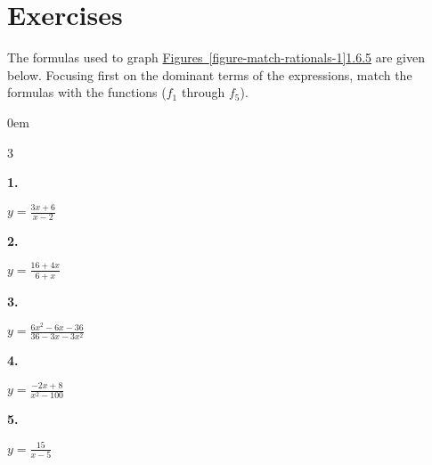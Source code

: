 \documentclass[12pt,]{book}
\theoremstyle{plain}
\theoremstyle{definition}
\numberwithin{equation}{section}
\newcounter{figstack}
\newlength\fight
\newcommand\pushValignCaptionBottom[5][b]{%
\stepcounter{figstack}%
\expandafter\def\csname %
figalign\romannumeral\value{figstack}\endcsname{#1}%
\expandafter\def\csname %
figtype\romannumeral\value{figstack}\endcsname{#2}%
\expandafter\def\csname %
figwd\romannumeral\value{figstack}\endcsname{#3}%
\expandafter\def\csname %
figcontent\romannumeral\value{figstack}\endcsname{#4}%
\expandafter\def\csname %
figcap\romannumeral\value{figstack}\endcsname{#5}%
\setbox0=\hbox{%
\begin{#2}{#3}#4\end{#2}}%
\ifdim\dimexpr\ht0+\dp0\relax>\fight\global\setlength{\fight}{%
\dimexpr\ht0+\dp0\relax}\fi%
}
\newenvironment{exercisegroup}%
{\medskip\noindent}%
{\par\bigskip}%
\newlength{\exercisegroupindent}%
\newlength{\exercisegroupitemwidth}%
\newenvironment{exercisegrouplist}%
{\vspace{-\partopsep}%
\begin{adjustwidth}{\exercisegroupindent}{0em}}%
{\end{adjustwidth}%
\vspace{-\partopsep}%
\vspace{\baselineskip}}%
\newenvironment{exercisegroupbycol}[1]%
{\begin{exercisegrouplist}%
\vspace{-\multicolsep}%
\begin{multicols}{#1}%
\setlength{\parindent}{0em}%
\setlength{\exercisegroupitemwidth}{\linewidth}}%
{\end{multicols}%
\vspace{-\multicolsep}%
\end{exercisegrouplist}}%
\newenvironment{exercisegroupitem}[1]%
{\begin{minipage}[t]{\exercisegroupitemwidth}
\vspace{0pt}%
{\bfseries#1}%
\rule{0pt}{\baselineskip}}{\strut%
\end{minipage}%
\hspace{\columnsep}}%
\providecommand\phantomsection{}
\begin{document}
\section*{Exercises}\label{exercises-6}

\begin{exercisegroup}%
The formulas used to graph \hyperref[figure-match-rationals-1]{Figures~\ref*{figure-match-rationals-1}}\textendash{}\hyperref[figure-match-rationals-5]{1.6.5} are given below.  Focusing first on the dominant terms of the expressions, match the formulas with the functions (\(f_1\) through \(f_5\)).%
\par
\begin{exercisegroupbycol}{3}%
\begin{exercisegroupitem}{1. }\phantomsection\hypertarget{exercise-47}{\null}
\(y=\frac{3x+6}{x-2}\)%
\end{exercisegroupitem}%
\par%
\begin{exercisegroupitem}{2. }\phantomsection\hypertarget{exercise-48}{\null}
\(y=\frac{16+4x}{6+x}\)%
\end{exercisegroupitem}%
\par%
\begin{exercisegroupitem}{3. }\phantomsection\hypertarget{exercise-49}{\null}
\(y=\frac{6x^2-6x-36}{36-3x-3x^2}\)%
\end{exercisegroupitem}%
\par%
\begin{exercisegroupitem}{4. }\phantomsection\hypertarget{exercise-50}{\null}
\(y=\frac{-2x+8}{x^2-100}\)%
\end{exercisegroupitem}%
\par%
\begin{exercisegroupitem}{5. }\phantomsection\hypertarget{exercise-51}{\null}
\(y=\frac{15}{x-5}\)%
\end{exercisegroupitem}%
\par%
\end{exercisegroupbycol}%
\begin{figure}
\centering
\pushValignCaptionBottom[b]{minipage}{.40\textwidth}{%
\pgfplotsset{every axis/.append style={width=\linewidth}}%
\centering%
{
\begin{tikzpicture}
\begin{axis}[
    xmin=-20,
    xmax=20,
    xtick={-20,-16,...,20},
    minor xtick={-20,-19,...,20},
    ymin=-20,
    ymax=20,
    ytick={-20,-16,...,20},
    minor ytick={-20,-19,...,20},
    ]
    \addplot[pccplot,samples=50,

\end{axis}
\end{tikzpicture}}}
\end{figure}
\end{exercisegroup}
\end{document}
